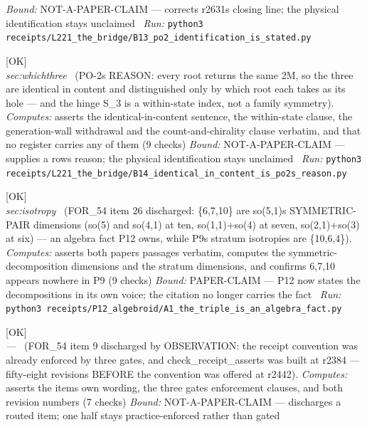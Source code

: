 \begin{description}
 \emph{Bound:} NOT-A-PAPER-CLAIM --- corrects r2631s closing line; the physical identification stays unclaimed
\ \emph{Run:} \texttt{python3 receipts/L221\_the\_bridge/B13\_po2\_identification\_is\_stated.py}
\item[\label{rcpt:B14_identical_in_content_is_po2s_reason}\texttt{B14\_identical\_in\_content\_is\_po2s\_reason}]\hfill\textsf{[OK]}\\
\textit{sec:whichthree} \ (PO-2s REASON: every root returns the same 2M, so the three are identical in content and distinguished only by which root each takes as its hole --- and the hinge S\_3 is a within-state index, not a family symmetry). 
\emph{Computes:} asserts the identical-in-content sentence, the within-state clause, the generation-wall withdrawal and the count-and-chirality clause verbatim, and that no register carries any of them (9 checks)
 \emph{Bound:} NOT-A-PAPER-CLAIM --- supplies a rows reason; the physical identification stays unclaimed
\ \emph{Run:} \texttt{python3 receipts/L221\_the\_bridge/B14\_identical\_in\_content\_is\_po2s\_reason.py}
\item[\label{rcpt:A1_the_triple_is_an_algebra_fact}\texttt{A1\_the\_triple\_is\_an\_algebra\_fact}]\hfill\textsf{[OK]}\\
\textit{sec:isotropy} \ (FOR\_54 item 26 discharged: \{6,7,10\} are so(5,1)s SYMMETRIC-PAIR dimensions (so(5) and so(4,1) at ten, so(1,1)+so(4) at seven, so(2,1)+so(3) at six) --- an algebra fact P12 owns, while P9s stratum isotropies are \{10,6,4\}). 
\emph{Computes:} asserts both papers passages verbatim, computes the symmetric-decomposition dimensions and the stratum dimensions, and confirms 6,7,10 appears nowhere in P9 (9 checks)
 \emph{Bound:} PAPER-CLAIM --- P12 now states the decompositions in its own voice; the citation no longer carries the fact
\ \emph{Run:} \texttt{python3 receipts/P12\_algebroid/A1\_the\_triple\_is\_an\_algebra\_fact.py}
\item[\label{rcpt:A2_item9_is_already_in_force}\texttt{A2\_item9\_is\_already\_in\_force}]\hfill\textsf{[OK]}\\
\textit{---} \ (FOR\_54 item 9 discharged by OBSERVATION: the receipt convention was already enforced by three gates, and check\_receipt\_asserts was built at r2384 --- fifty-eight revisions BEFORE the convention was offered at r2442). 
\emph{Computes:} asserts the items own wording, the three gates enforcement clauses, and both revision numbers (7 checks)
 \emph{Bound:} NOT-A-PAPER-CLAIM --- discharges a routed item; one half stays practice-enforced rather than gated

\end{description}
